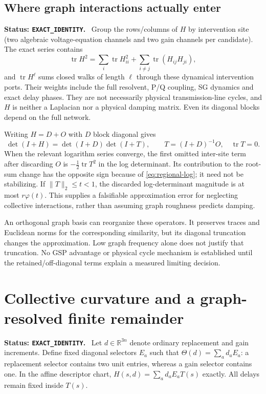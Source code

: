 \documentclass[11pt]{article}
\newcommand{\status}[1]{\par\smallskip\noindent\textbf{Status: \texttt{#1}.}\ }
\begin{document}
\subsection{Where graph interactions actually enter}
\status{EXACT\_IDENTITY}
Group the rows/columns of $H$ by intervention site (two algebraic
voltage-equation channels and two gain channels per candidate).
The exact series contains
\[
 \operatorname{tr}H^2
 =\sum_i\operatorname{tr}H_{ii}^2
   +\sum_{i\ne j}\operatorname{tr}(H_{ij}H_{ji}),
\]
and $\operatorname{tr}H^\ell$ sums closed walks of length $\ell$
through these dynamical intervention ports. Their weights include
the full resolvent, P/Q coupling, SG dynamics and exact delay phases.
They are not necessarily physical transmission-line cycles, and $H$
is neither a Laplacian nor a physical damping matrix.
Even its diagonal blocks depend on the full network.

Writing $H=D+O$ with $D$ block diagonal gives
\[
 \det(I+H)=\det(I+D)\det(I+T),\qquad T=(I+D)^{-1}O,\quad
 \operatorname{tr}T=0.
\]
When the relevant logarithm series converge, the first omitted
inter-site term after discarding $O$ is
$-\tfrac12\operatorname{tr}T^2$ in the log determinant.
Its contribution to the root-sum change has the opposite sign
because of \eqref{eq:regional-log}; it need not be stabilizing.
If $\|T\|_2\le t<1$, the discarded log-determinant magnitude is
at most $r\varphi(t)$.
This supplies a falsifiable approximation error for neglecting
collective interactions, rather than assuming graph roughness
predicts damping.

An orthogonal graph basis can reorganize these operators.
It preserves traces and Euclidean norms for the corresponding
similarity, but its diagonal truncation changes the approximation.
Low graph frequency alone does not justify that truncation.
No GSP advantage or physical cycle mechanism is established until
the retained/off-diagonal terms explain a measured limiting decision.

\section{Collective curvature and a graph-resolved finite remainder}
\label{sec:walkbounds}
\status{EXACT\_IDENTITY}
Let $d\in\mathbb R^{3n}$ denote ordinary replacement and gain increments.
Define fixed diagonal selectors $E_a$ such that
$\Theta(d)=\sum_a d_a E_a$: a replacement selector contains two unit
entries, whereas a gain selector contains one. In the affine descriptor
chart, $H(s,d)=\sum_a d_a E_aT(s)$ exactly.
All delays remain fixed inside $T(s)$.
\end{document}
